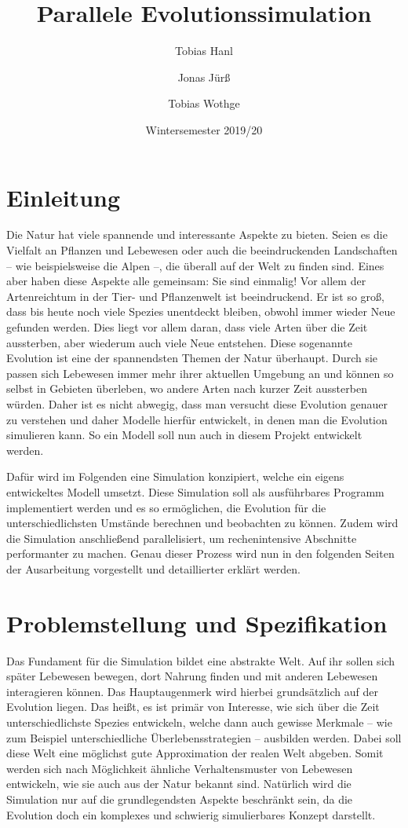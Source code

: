 \documentclass[course=erap]{aspdoc}
\author{Tobias Hanl \and Jonas Jürß \and Tobias Wothge}
\date{Wintersemester 2019/20} %
\title{Parallele Evolutionssimulation}
\begin{document}
\maketitle


\setcounter{tocdepth}{2}
\tableofcontents


\newpage


\section{Einleitung}
Die Natur hat viele spannende und interessante Aspekte zu bieten. Seien es die Vielfalt an Pflanzen und Lebewesen oder auch die beeindruckenden Landschaften -- wie beispielsweise die Alpen --, die überall auf der Welt zu finden sind. Eines aber haben diese Aspekte alle gemeinsam: Sie sind einmalig! Vor allem der Artenreichtum in der Tier- und Pflanzenwelt ist beeindruckend. Er ist so groß, dass bis heute noch viele Spezies unentdeckt bleiben, obwohl immer wieder Neue gefunden werden. Dies liegt vor allem daran, dass viele Arten über die Zeit aussterben, aber wiederum auch viele Neue entstehen. Diese sogenannte Evolution ist eine der spannendsten Themen der Natur überhaupt. Durch sie passen sich Lebewesen immer mehr ihrer aktuellen Umgebung an und können so selbst in Gebieten überleben, wo andere Arten nach kurzer Zeit aussterben würden. Daher ist es nicht abwegig, dass man versucht diese Evolution genauer zu verstehen und daher Modelle hierfür entwickelt, in denen man die Evolution simulieren kann. So ein Modell soll nun auch in diesem Projekt entwickelt werden.

Dafür wird im Folgenden eine Simulation konzipiert, welche ein eigens entwickeltes Modell umsetzt. Diese Simulation soll als ausführbares Programm implementiert werden und es so ermöglichen, die Evolution für die unterschiedlichsten Umstände berechnen und beobachten zu können. Zudem wird die Simulation anschließend parallelisiert, um rechenintensive Abschnitte performanter zu machen. Genau dieser Prozess wird nun in den folgenden Seiten der Ausarbeitung vorgestellt und detaillierter erklärt werden.


\section{Problemstellung und Spezifikation}
Das Fundament für die Simulation bildet eine abstrakte Welt. Auf ihr sollen sich später Lebewesen bewegen, dort Nahrung finden und mit anderen Lebewesen interagieren können. Das Hauptaugenmerk wird hierbei grundsätzlich auf der Evolution liegen. Das heißt, es ist primär von Interesse, wie sich über die Zeit unterschiedlichste Spezies entwickeln, welche dann auch gewisse Merkmale -- wie zum Beispiel unterschiedliche Überlebensstrategien -- ausbilden werden. Dabei soll diese Welt eine möglichst gute Approximation der realen Welt abgeben. Somit werden sich nach Möglichkeit ähnliche Verhaltensmuster von Lebewesen entwickeln, wie sie auch aus der Natur bekannt sind. Natürlich wird die Simulation nur auf die grundlegendsten Aspekte beschränkt sein, da die Evolution doch ein komplexes und schwierig simulierbares Konzept darstellt.
\end{document}
